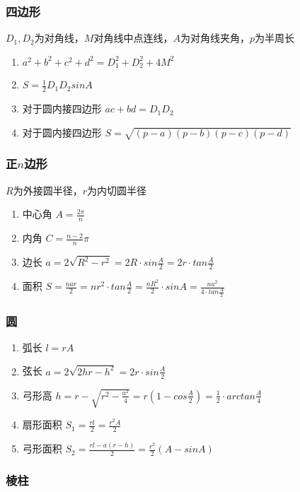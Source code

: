 \documentclass[landscape,twocolumn,a4paper]{article}
\begin{document}
	\subsubsection*{四边形}

	$D_1, D_2$为对角线，$M$对角线中点连线，$A$为对角线夹角，$p$为半周长
	\begin{enumerate}
		\item $a^2+b^2+c^2+d^2=D_1^2+D_2^2+4M^2$
		\item $S=\frac{1}{2}D_1D_2sinA$
		\item 对于圆内接四边形
		$ac+bd=D_1D_2$
		\item 对于圆内接四边形
		$S=\sqrt{(p-a)(p-b)(p-c)(p-d)}$
	\end{enumerate}

	\subsubsection*{正$n$边形}

	$R$为外接圆半径，$r$为内切圆半径
	\begin{enumerate}
		\item 中心角
		$A=\frac{2\pi}{n}$
		\item 内角
		$C=\frac{n-2}{n}\pi$
		\item 边长
		$a=2\sqrt{R^2-r^2}=2R \cdot sin\frac{A}{2}=2r \cdot tan\frac{A}{2}$
		\item 面积
		$S=\frac{nar}{2}=nr^2 \cdot tan\frac{A}{2}=\frac{nR^2}{2} \cdot sinA=\frac{na^2}{4 \cdot tan\frac{A}{2}}$
	\end{enumerate}

	\subsubsection*{圆}

	\begin{enumerate}
		\item 弧长
		$l=rA$
		\item 弦长
		$a=2\sqrt{2hr-h^2}=2r\cdot sin\frac{A}{2}$
		\item 弓形高
		$h=r-\sqrt{r^2-\frac{a^2}{4}}=r(1-cos\frac{A}{2})=\frac{1}{2} \cdot arctan\frac{A}{4}$
		\item 扇形面积
		$S_1=\frac{rl}{2}=\frac{r^2A}{2}$
		\item 弓形面积
		$S_2=\frac{rl-a(r-h)}{2}=\frac{r^2}{2}(A-sinA)$
	\end{enumerate}

	\subsubsection*{棱柱}
\end{document}
